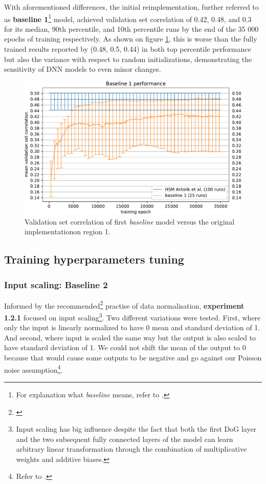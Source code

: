 With aforementioned differences, the initial reimplementation, further referred to as \textbf{baseline 1}\footnote{For explanation what \textit{baseline} means, refer to .} model, achieved validation set correlation of 0.42, 0.48, and 0.3 for its median, 90th percentile, and 10th percentile runs by the end of the 35 000 epochs of training respectively. As shown on figure \ref{fig:5.1.1.1}, this is worse than the fully trained results reported by \citeauthor{antolik} (0.48, 0.5, 0.44) in both top percentile performance but also the variance with respect to random initializations, demonstrating the sensitivity of DNN models to even minor changes.

\begin{figure}[H]
    \centering
    \includegraphics[width=1\textwidth]{../figures/05_1_1_1}
    \caption[Experiment 1.1.1]{Validation set correlation of first \textit{baseline} model versus the original \cite{antolik} implementation\protect\footnotemark on region 1.}
    \label{fig:5.1.1.1}
\end{figure}

\subsection{Training hyperparameters tuning}
\subsubsection{Input scaling: Baseline 2}\label{ex:1.2.1}
Informed by the recommended\footnote{\citep{10.5555/645754.668382}} practise of data normalisation, \textbf{experiment 1.2.1} focused on input scaling\footnote{Input scaling has big influence despite the fact that both the first DoG layer and the two subsequent fully connected layers of the model can learn arbitrary linear transformation through the combination of multiplicative weights and additive biases.}. Two different variations were tested. First, where only the input is linearly normalized to have 0 mean and standard deviation of 1. And second, where input is scaled the same way but the output is also scaled to have standard deviation of 1. We could not shift the mean of the output to 0 because that would cause some outputs to be negative and go against our Poisson noise assumption\footnote{Refer to .}.


